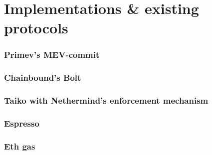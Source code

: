 \documentclass[a4paper]{article}
\theoremstyle{boldstyle}
\begin{document}
\section{Implementations \& existing protocols}

        \subsubsection{ \textbf{Primev's MEV-commit}}
        

        \subsubsection{ \textbf{Chainbound's Bolt}}
        
        \subsubsection{ \textbf{Taiko with Nethermind's enforcement mechanism}}
        
        \subsubsection{ \textbf{Espresso}}
        
        \subsubsection{ \textbf{Eth gas}}
        
\end{document}
